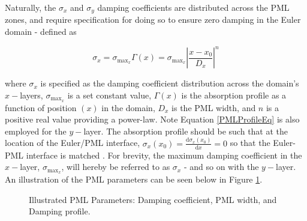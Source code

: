 Naturally, the $\sigma_x$ and $\sigma_y$ damping coefficients are distributed across the PML zones, and require specification for doing so to ensure zero damping in the Euler domain - defined as

\begin{equation} \label{PMLProfileEq}
\sigma_{x} = \sigma_{\mathrm{max}_x} \Gamma \left( x \right) = \sigma_{\mathrm{max}_x} \left| \frac{x-x_0}{D_x} \right|^n
\end{equation}

where $\sigma_x$ is specified as the damping coefficient distribution across the domain's $x-$layers, $\sigma_{\mathrm{max}_x}$ is a set constant value, $\Gamma \left(x \right)$ is the absorption profile as a function of position $\left( x \right)$ in the domain, $D_x$ is the PML width, and $n$ is a positive real value providing a power-law. Note Equation \ref{PMLProfileEq} is also employed for the $y-$layer. 
The absorption profile should be such that at the location of the Euler/PML interface, $\sigma_{x} \left( x_0 \right) = \frac{\mathrm{d}\sigma_{x} \left( x_0 \right)}{\mathrm{d}x} = 0$ so that the Euler-PML interface is matched \cite{choung2018nonreflective}. For brevity, the maximum damping coefficient in the $x-$layer, $\sigma_{\mathrm{max}_x}$, will hereby be referred to as $\sigma_x$ - and so on with the $y-$layer. An illustration of the PML parameters can be seen below in Figure \ref{fig:PMLParameters}.

\begin{figure}[h!]
\centering
{}
\caption{Illustrated PML Parameters: Damping coefficient, PML width, and Damping profile.}
\label{fig:PMLParameters}
\end{figure}
